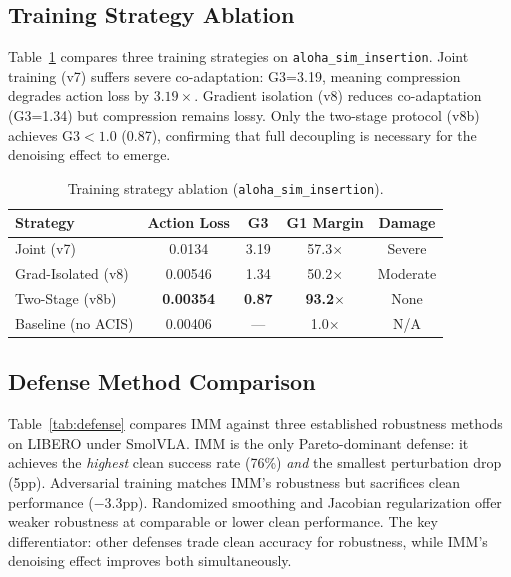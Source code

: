 \documentclass[10pt,twocolumn]{article}
\begin{document}
\subsection{Training Strategy Ablation}
\label{sec:ablation_training}

Table~\ref{tab:train_ablation} compares three training strategies on \texttt{aloha\_sim\_insertion}. Joint training (v7) suffers severe co-adaptation: G3=3.19, meaning compression degrades action loss by $3.19\times$. Gradient isolation (v8) reduces co-adaptation (G3=1.34) but compression remains lossy. Only the two-stage protocol (v8b) achieves G3$<1.0$ (0.87), confirming that full decoupling is necessary for the denoising effect to emerge.

\begin{table}[t]
\centering
\caption{Training strategy ablation (\texttt{aloha\_sim\_insertion}).}
\label{tab:train_ablation}
\begin{tabular}{lcccc}
\toprule
Strategy & Action Loss & G3 & G1 Margin & Damage \\
\midrule
Joint (v7) & 0.0134 & 3.19 & 57.3$\times$ & Severe \\
Grad-Isolated (v8) & 0.00546 & 1.34 & 50.2$\times$ & Moderate \\
Two-Stage (v8b) & \textbf{0.00354} & \textbf{0.87} & \textbf{93.2$\times$} & None \\
Baseline (no ACIS) & 0.00406 & --- & 1.0$\times$ & N/A \\
\bottomrule
\end{tabular}
\end{table}

\subsection{Defense Method Comparison}
\label{sec:defense_compare}

Table~\ref{tab:defense} compares IMM against three established robustness methods on LIBERO under SmolVLA. IMM is the only Pareto-dominant defense: it achieves the \emph{highest} clean success rate (76\%) \emph{and} the smallest perturbation drop (5pp). Adversarial training matches IMM's robustness but sacrifices clean performance ($-3.3$pp). Randomized smoothing and Jacobian regularization offer weaker robustness at comparable or lower clean performance. The key differentiator: other defenses trade clean accuracy for robustness, while IMM's denoising effect improves both simultaneously.
\end{document}
